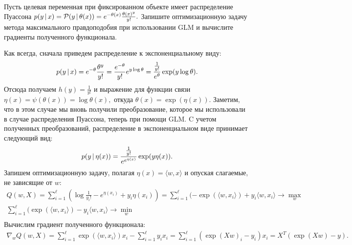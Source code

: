 \documentclass[12pt,a4paper]{article}
\begin{document}
    \begin{vkProblem}
        Пусть целевая переменная при фиксированном объекте имеет распределение Пуассона $p(y \mspace{3mu}{|}\mspace{3mu} x) = \mathcal{P} (y \mspace{3mu}{|}\mspace{3mu} \theta(x)) = e^{-\theta(x)} \frac{\theta(x)^y}{y!}.$ Запишите оптимизационную задачу метода максимального правдоподобия при использовании GLM и вычислите градиенты полученного функционала.
    \end{vkProblem}
    
    \begin{esSolution}
        \par Как всегда, сначала приведем распределение к экспоненциальному виду:
        \begin{align*}
            p(y \mspace{3mu}{|}\mspace{3mu} x) = e^{-\theta} \frac{\theta^y}{y!} = 
            \frac{e^{-\theta}}{y!} e^{y \log \theta} = 
            \frac{\frac{1}{y!}}{e^\theta} \exp(y \log \theta).
        \end{align*}
        Отсюда получаем $h(y) = \frac{1}{y!}$ и выражение для функции связи $\eta(x) = \psi(\theta(x)) = \log \theta(x),$ откуда $\theta(x) = \exp(\eta(x)).$ Заметим, что в этом случае мы вновь получили преобразование, которое мы использовали в случае распределения Пуассона, теперь при помощи GLM. C учетом полученных преобразований, распределение в экспоненциальном виде принимает следующий вид:
        \begin{align*}
            p(y \mspace{3mu}{|}\mspace{3mu} \eta(x)) = \frac{\frac{1}{y!}}{e^{e^{\eta(x)}}} \exp(y \eta(x)).
        \end{align*}
        Запишем оптимизационную задачу, полагая $\eta(x) = \langle w, x \rangle$ и опуская слагаемые, не зависящие от $w$: 
        \begin{align*}
            Q(w, X) = \sum_{i=1}^\ell \left( \log \frac{1}{y_i!} - e^{\eta(x_i)} + y_i \eta(x_i) \right) = 
            \sum_{i=1}^\ell (-\exp(\langle w, x_i \rangle) + y_i \langle w, x_i \rangle \to \max_w\\
            \sum_{i=1}^\ell (\exp(\langle w, x_i \rangle) - y_i \langle w, x_i \rangle \to \min_w\\
        \end{align*}
        Вычислим градиент полученного функционала:
        \begin{align*}
            \nabla_w Q(w, X) = \sum_{i=1}^\ell \exp(\langle w, x_i \rangle) x_i - \sum_{i=1}^\ell y_i x_i =
            \sum_{i=1}^\ell \left( \exp (Xw)_i - y_i \right) x_i = X^T \left(\exp (Xw) - y \right).
        \end{align*}
    \end{esSolution}
\end{document}
